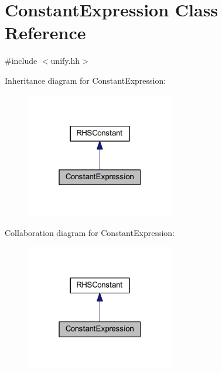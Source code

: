 \hypertarget{class_constant_expression}{}\section{Constant\+Expression Class Reference}
\label{class_constant_expression}


{\ttfamily \#include $<$unify.\+hh$>$}



Inheritance diagram for Constant\+Expression\+:
\nopagebreak
\begin{figure}[H]
\begin{center}
\leavevmode
\includegraphics[width=184pt]{class_constant_expression__inherit__graph}
\end{center}
\end{figure}


Collaboration diagram for Constant\+Expression\+:
\nopagebreak
\begin{figure}[H]
\begin{center}
\leavevmode
\includegraphics[width=184pt]{class_constant_expression__coll__graph}
\end{center}
\end{figure}
